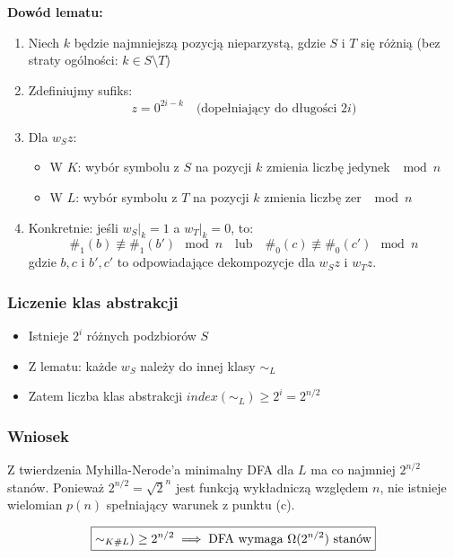 \documentclass{article}
\theoremstyle{definition}
\theoremstyle{remark}
\begin{document}
\textbf{Dowód lematu:}
\begin{enumerate}
    \item Niech $k$ będzie najmniejszą pozycją nieparzystą, gdzie $S$ i $T$ się różnią (bez straty ogólności: $k \in S \setminus T$)
    
    \item Zdefiniujmy sufiks:
    \[
    z = 0^{2i - k} \quad \text{(dopełniający do długości $2i$)}
    \]
    
    \item Dla $w_S z$:
    \begin{itemize}
        \item W $K$: wybór symbolu z $S$ na pozycji $k$ zmienia liczbę jedynek $\mod n$
        \item W $L$: wybór symbolu z $T$ na pozycji $k$ zmienia liczbę zer $\mod n$
    \end{itemize}
    
    \item Konkretnie: jeśli $w_S|_k = 1$ a $w_T|_k = 0$, to:
    \[
    \#_1(b) \not\equiv \#_1(b') \mod n \quad \text{lub} \quad \#_0(c) \not\equiv \#_0(c') \mod n
    \]
    gdzie $b,c$ i $b',c'$ to odpowiadające dekompozycje dla $w_S z$ i $w_T z$.
\end{enumerate}

\subsubsection{Liczenie klas abstrakcji}
\begin{itemize}
    \item Istnieje $2^i$ różnych podzbiorów $S$
    \item Z lematu: każde $w_S$ należy do innej klasy $\sim_L$
    \item Zatem liczba klas abstrakcji $index(\sim_L) \geq 2^i = 2^{n/2}$
\end{itemize}

\subsubsection{Wniosek}
Z twierdzenia Myhilla-Nerode’a minimalny DFA dla $L$ ma co najmniej $2^{n/2}$ stanów. Ponieważ $2^{n/2} = \sqrt{2}^n$ jest funkcją wykładniczą względem $n$, nie istnieje wielomian $p(n)$ spełniający warunek z punktu (c).

\[
\boxed{\index(\sim_{K\#L}) \geq 2^{n/2} \implies \text{DFA wymaga } \Omega(2^{n/2}) \text{ stanów}}
\]
\end{document}
